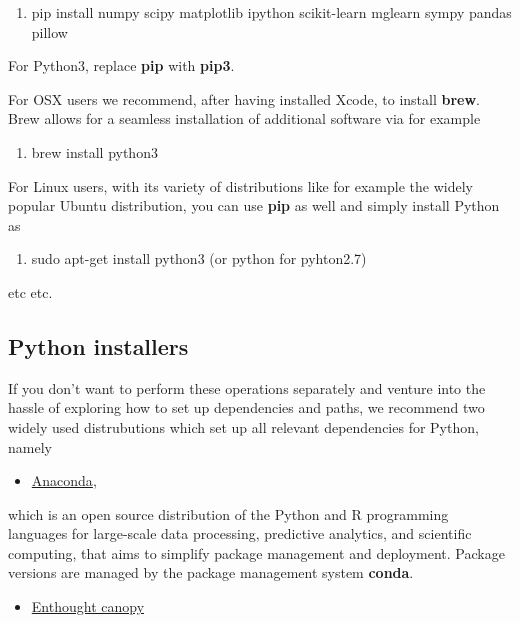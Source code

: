 \documentclass[%
oneside,                 %
final,                   %
10pt]{article}
\begin{document}
\begin{enumerate}
\item pip install numpy scipy matplotlib ipython scikit-learn mglearn sympy pandas pillow 
\end{enumerate}

\noindent
For Python3, replace \textbf{pip} with \textbf{pip3}.

For OSX users we recommend, after having installed Xcode, to
install \textbf{brew}. Brew allows for a seamless installation of additional
software via for example 

\begin{enumerate}
\item brew install python3
\end{enumerate}

\noindent
For Linux users, with its variety of distributions like for example the widely popular Ubuntu distribution,
you can use \textbf{pip} as well and simply install Python as 

\begin{enumerate}
\item sudo apt-get install python3  (or python for pyhton2.7)
\end{enumerate}

\noindent
etc etc. 



\subsection*{Python installers}

If you don't want to perform these operations separately and venture
into the hassle of exploring how to set up dependencies and paths, we
recommend two widely used distrubutions which set up all relevant
dependencies for Python, namely 

\begin{itemize}
\item \href{{https://docs.anaconda.com/}}{Anaconda}, 
\end{itemize}

\noindent
which is an open source
distribution of the Python and R programming languages for large-scale
data processing, predictive analytics, and scientific computing, that
aims to simplify package management and deployment. Package versions
are managed by the package management system \textbf{conda}. 

\begin{itemize}
\item \href{{https://www.enthought.com/product/canopy/}}{Enthought canopy} 
\end{itemize}
\end{document}
